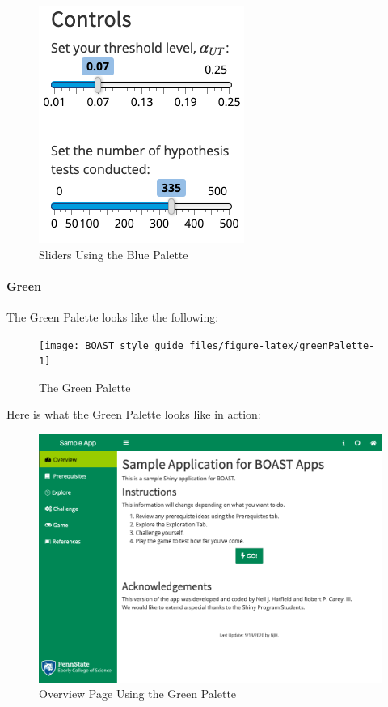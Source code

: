 \documentclass[
]{book}
\begin{document}
\begin{figure}

{\centering \includegraphics{images/blueSliders} 

}

\caption{Sliders Using the Blue Palette}\label{fig:blueAction3}
\end{figure}

\hypertarget{green}{%
\paragraph{Green}\label{green}}

The Green Palette looks like the following:

\begin{figure}

{\centering \texttt{[image: BOAST\_style\_guide\_files/figure-latex/greenPalette-1]} 

}

\caption{The Green Palette}\label{fig:greenPalette}
\end{figure}

Here is what the Green Palette looks like in action:

\begin{figure}

{\centering \includegraphics[width=14in]{images/greenOverview} 

}

\caption{Overview Page Using the Green Palette}\label{fig:greenAction1}
\end{figure}
\end{document}
